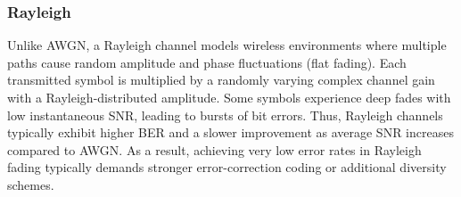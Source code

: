 \subsubsection{Rayleigh}

Unlike AWGN, a Rayleigh channel models wireless environments where multiple paths cause random amplitude and phase fluctuations (flat fading). Each transmitted symbol is multiplied by a randomly varying complex channel gain with a Rayleigh-distributed amplitude. Some symbols experience deep fades with low instantaneous SNR, leading to bursts of bit errors. Thus, Rayleigh channels typically exhibit higher BER and a slower improvement as average SNR increases compared to AWGN. As a result, achieving very low error rates in Rayleigh fading typically demands stronger error-correction coding or additional diversity schemes.


